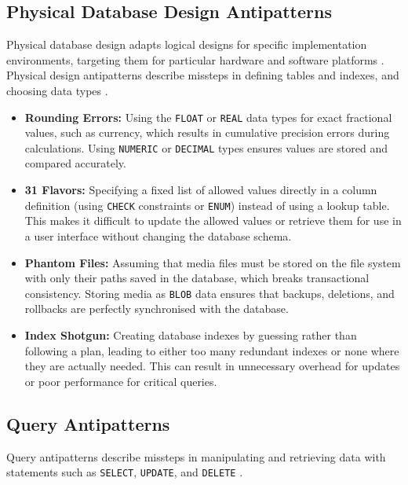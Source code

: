 \subsection{Physical Database Design Antipatterns}\label{sec:physicalAntipatterns}

Physical database design adapts logical designs for specific implementation environments, targeting them for particular hardware and software platforms . Physical design antipatterns describe missteps in defining tables and indexes, and choosing data types .

\begin{itemize}
    \item \textbf{Rounding Errors:}  Using the \texttt{FLOAT} or \texttt{REAL} data types for exact fractional values, such as currency, which results in cumulative precision errors during calculations. Using \texttt{NUMERIC} or \texttt{DECIMAL} types ensures values are stored and compared accurately.
    \item \textbf{31 Flavors:}  Specifying a fixed list of allowed values directly in a column definition (using \texttt{CHECK} constraints or \texttt{ENUM}) instead of using a lookup table. This makes it difficult to update the allowed values or retrieve them for use in a user interface without changing the database schema.
    \item \textbf{Phantom Files:}  Assuming that media files must be stored on the file system with only their paths saved in the database, which breaks transactional consistency. Storing media as \texttt{BLOB} data ensures that backups, deletions, and rollbacks are perfectly synchronised with the database.
    \item \textbf{Index Shotgun:}  Creating database indexes by guessing rather than following a plan, leading to either too many redundant indexes or none where they are actually needed. This can result in unnecessary overhead for updates or poor performance for critical queries.
\end{itemize}

\subsection{Query Antipatterns}\label{sec:queryAntipatterns}

Query antipatterns describe missteps in manipulating and retrieving data with statements such as \texttt{SELECT}, \texttt{UPDATE}, and \texttt{DELETE} .

